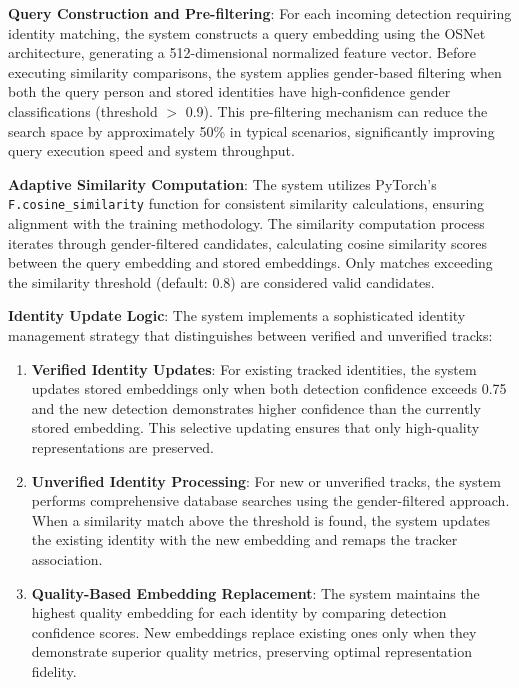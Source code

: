 \textbf{Query Construction and Pre-filtering}: For each incoming detection requiring identity matching, the system constructs a query embedding using the OSNet architecture, generating a 512-dimensional normalized feature vector. Before executing similarity comparisons, the system applies gender-based filtering when both the query person and stored identities have high-confidence gender classifications (threshold $>$ 0.9). This pre-filtering mechanism can reduce the search space by approximately 50\% in typical scenarios, significantly improving query execution speed and system throughput.

\textbf{Adaptive Similarity Computation}: The system utilizes PyTorch's\\ \texttt{F.cosine\_similarity} function for consistent similarity calculations, ensuring alignment with the training methodology. The similarity computation process iterates through gender-filtered candidates, calculating cosine similarity scores between the query embedding and stored embeddings. Only matches exceeding the similarity threshold (default: 0.8) are considered valid candidates.

\textbf{Identity Update Logic}: The system implements a sophisticated identity management strategy that distinguishes between verified and unverified tracks:

\begin{enumerate}
   \item \textbf{Verified Identity Updates}: For existing tracked identities, the system updates stored embeddings only when both detection confidence exceeds 0.75 and the new detection demonstrates higher confidence than the currently stored embedding. This selective updating ensures that only high-quality representations are preserved.
   \item \textbf{Unverified Identity Processing}: For new or unverified tracks, the system performs comprehensive database searches using the gender-filtered approach. When a similarity match above the threshold is found, the system updates the existing identity with the new embedding and remaps the tracker association.
   \item \textbf{Quality-Based Embedding Replacement}: The system maintains the highest quality embedding for each identity by comparing detection confidence scores. New embeddings replace existing ones only when they demonstrate superior quality metrics, preserving optimal representation fidelity.
\end{enumerate}

